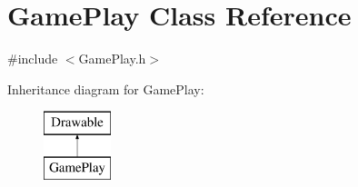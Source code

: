 \hypertarget{class_game_play}{\section{Game\-Play Class Reference}
\label{class_game_play}
}


{\ttfamily \#include $<$Game\-Play.\-h$>$}

Inheritance diagram for Game\-Play\-:\begin{figure}[H]
\begin{center}
\leavevmode
\includegraphics[height=2.000000cm]{class_game_play}
\end{center}
\end{figure}
